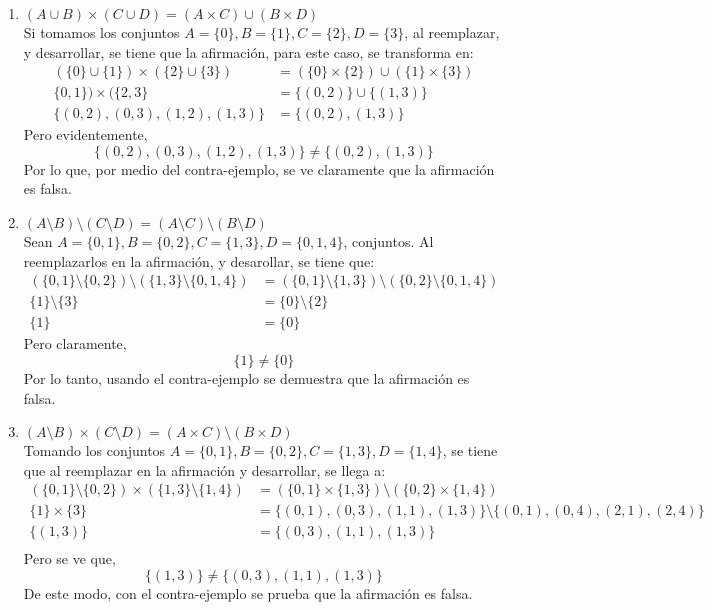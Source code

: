 \documentclass[letter]{article}
\begin{document}
	
	\begin{pregunta}{1} %
		\begin{enumerate}
		\item $(A \cup B) \times (C \cup D) = (A \times C) \cup (B \times D)$\vspace{0.5em}\\
		Si tomamos los conjuntos $A=\{0\}, B=\{1\}, C=\{2\}, D=\{3\}$, al reemplazar, y desarrollar, se tiene que la afirmación, para este caso, se transforma en:
		\begin{align*}
			(\{0\} \cup \{1\}) \times (\{2\} \cup \{3\}) &= (\{0\} \times \{2\}) \cup (\{1\} \times \{3\})\\
			\{0,1\}) \times (\{2,3\} &= \{(0,2)\} \cup \{(1,3)\}\\
			\{(0,2),(0,3),(1,2),(1,3)\} &= \{(0,2),(1,3)\}
		\end{align*}
		Pero evidentemente,
			$$\{(0,2),(0,3),(1,2),(1,3)\} \neq \{(0,2),(1,3)\}$$
		Por lo que, por medio del contra-ejemplo, se ve claramente que la afirmación es falsa.
		
		\item $(A \setminus B) \setminus (C \setminus D) = (A \setminus C) \setminus (B \setminus D)$\vspace{0.5em}\\
		Sean $A=\{0,1\}, B=\{0,2\}, C=\{1,3\}, D=\{0,1,4\}$, conjuntos. Al reemplazarlos en la afirmación, y desarollar, se tiene que:
		\begin{align*}
			(\{0,1\} \setminus \{0,2\}) \setminus (\{1,3\} \setminus \{0,1,4\}) &= (\{0,1\} \setminus \{1,3\}) \setminus (\{0,2\} \setminus \{0,1,4\})\\
			\{1\} \setminus \{3\} &= \{0\} \setminus \{2\}\\
			\{1\} &= \{0\}
		\end{align*}
		Pero claramente,
			$$\{1\} \neq \{0\}$$
		Por lo tanto, usando el contra-ejemplo se demuestra que la afirmación es falsa.

		\item $(A \setminus B) \times (C \setminus D) = (A \times C) \setminus (B \times D)$\vspace{0.5em}\\ 
		Tomando los conjuntos $A=\{0,1\}, B=\{0,2\}, C=\{1,3\}, D=\{1,4\}$, se tiene que al reemplazar en la afirmación y desarrollar, se llega a:
		\begin{align*}
			(\{0,1\} \setminus \{0,2\}) \times (\{1,3\} \setminus \{1,4\}) &= (\{0,1\} \times \{1,3\}) \setminus (\{0,2\} \times \{1,4\})\\
			\{1\} \times \{3\} &= \{(0,1),(0,3),(1,1),(1,3)\} \setminus \{(0,1),(0,4),(2,1),(2,4)\}\\
			\{(1,3)\} &= \{(0,3),(1,1),(1,3)\}\\
		\end{align*}
		Pero se ve que,
			$$\{(1,3)\} \neq \{(0,3),(1,1),(1,3)\}$$
		De este modo, con el contra-ejemplo se prueba que la afirmación es falsa.
		\end{enumerate}
	\end{pregunta}
	
\end{document}

